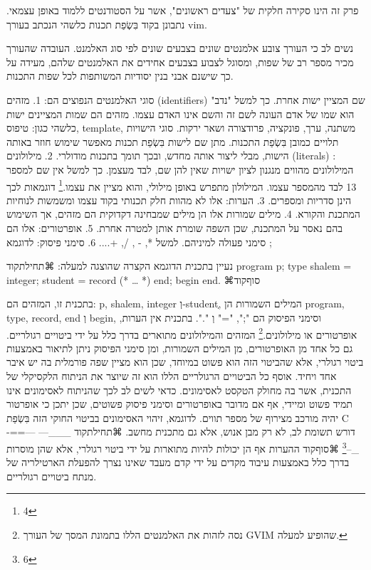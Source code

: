       פרק זה הינו סקירה חלקית של "צעדים ראשונים", אשר על הסטודנטים ללמוד באופן עצמאי.
      נתבונן בקוד בִּשְׂפַת  תכנות כלשהי הנכתב בעורך vim. 
      
      
      נשים לב כי העורך צובע אלמנטים שונים בצבעים שונים לפי סוג האלמנט. העובדה שהעורך מכיר מספר רב של שפות, ומסוגל לצבוע בצבעים אחידים את האלמנטים שלהם, מעידה על כך שישנם  אבני בנין יסודיות המשותפות לכל שפות התכנות.


      סוגי האלמנטים הנפוצים הם:
      1. מזהים (identifiers) שם המציין ישות אחרת. כך למשל "נדב" הוא שמו של אדם העונה לשם זה והשם אינו האדם עצמו. מזהים הם שמות המציינים ישות כלשהי כגון: טיפוס, template, משתנה, ערך, פונקציה, פרודצורה ושאר ירקות. סוגי הישויות תלויים כמובן בִּשְׂפַת  התכנות.
      מתן שם לישות בִּשְׂפַת  תכנות מאפשר שימוש חוזר באותה הישות, מבלי ליצור אותה מחדש, ובכך תומך בתכנות מודולרי.
      2. מילולונים (literals) : המילולונים מהווים מנגנון לציון ישויות שאין להן שם, לבד מעצמן. כך למשל אין שם למספר 13 לבד מהמספר עצמו. המילולון מתפרש באופן מילולי, והוא מציין את עצמו.\footnote{4}  דוגמאות לכך הינן סדריות ומספרים.
      3. הערות: אלו לא מהוות חלק תכנותי בקוד עצמו ומשמשות לנוחיות המתכנת והקורא.
      4. מילים שמורות אלו הן מילים שמבחינה דקדוקית הם מזהים, אך השימוש בהם נאסר על המתכנת, שכן השפה שומרת אותן למטרה אחרת.
      5. אופרטורים: אלו הם סימני פעולה למיניהם. למשל *, - , /, +....
      6. סימני פיסוק: לדוגמא ;

      נעיין בתכנית הדוגמא הקצרה שהוצגה למעלה:
⌘תחילת{קוד}
program p;
type
shalem = integer;
student = record  (* … *) end;
begin
end.
⌘סוף{קוד}


      בתכנית זו, המזהים הם: p, shalem, integer וְ-studentְ, המילים השמורות הן program, type, record, end וְ begin, וסימני הפיסוק הם ";", "=" וְ ".". בתכנית אין הערות, אופרטורים או מילולונים.\footnote{ נסה לזהות את האלמנטים הללו בתמונת המסך של העורך GVIM שהופיע למעלה.}
      המזהים והמילולונים מתוארים בדרך כלל על ידי ביטויים רגולריים. גם כל אחד מן האופרטורים, מן המילים השמורות, ומן סימני הפיסוק ניתן לתיאור באמצעות ביטוי רגולרי, אלא שהביטוי הזה הוא פשוט במיוחד, שכן הוא מציין שפה פורמלית בה יש איבר אחד ויחיד. אוסף כל הביטויים הרגולריים הללו הוא זה שיוצר את הניתוח הלקסיקלי של התכנית, אשר בה מחולק הטקסט לאסימונים.
      כדאי לשים לב לכך שהניתוח לאסימונים אינו תמיד פשוט ומיידי, אף אם מדובר באופרטורים וסימני פיסוק פשוטים, שכן יתכן כי אופרטור יהיה מורכב מצירוף של מספר תווים. לדוגמא, זיהוי האסימונים בביטוי החוקי הזה בִּשְׂפַת C דורש תשומת לב, לא רק מבן אנוש, אלא גם מתכנית מחשב.
⌘תחילת{קוד}
\_\_\_--- ---==-\_--\footnote{6}
⌘סוף{קוד}
      ההערות אף הן יכולות להיות מתוארות על ידי ביטוי רגולרי, אלא שהן מוסרות בדרך כלל
      באמצעות עיבוד מקדים על ידי קדם מעבד שאינו נצרך להפעלת הארטילריה של מנתח ביטויים
      רגולריים.

